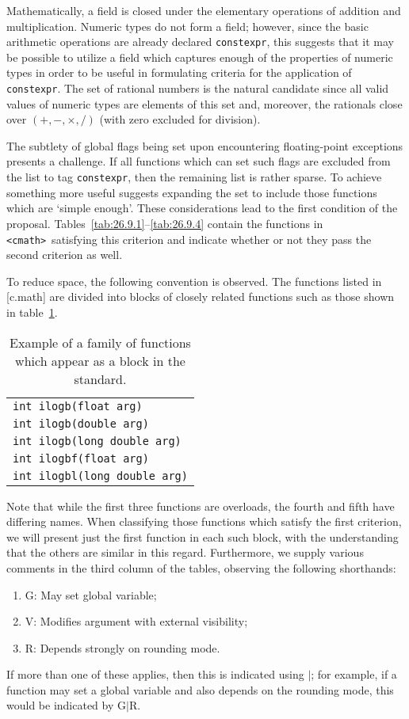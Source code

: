 \documentclass[prd,twocolumn,amsmath,amssymb,nofootinbib,eqsecnum]{revtex4-1}
\newcommand{\constexpr}{\code{constexpr}\xspace}
\newcommand{\code}[1]{{\tt #1}}
\newcommand{\header}[1]{{\tt <#1>}}
\newcommand{\cmath}{\header{cmath}}
\begin{document}
Mathematically, a field is closed under the elementary operations of addition
and multiplication.
Numeric types do not form a field; however, since the basic arithmetic
operations are already declared \constexpr, this suggests that it may be
possible to utilize a field which captures enough of the properties of numeric
types in order to be useful in formulating criteria for the application of
\constexpr. The set of rational numbers is the natural candidate since all valid
values of numeric types are elements of this set and, moreover, the rationals close over
$(+,-,\times,/)$ (with zero excluded for division).

The subtlety of global flags being set upon encountering floating-point
exceptions presents a challenge. If all functions which can set such flags are
excluded from the list to tag \constexpr, then the remaining list is rather
sparse. To achieve something more useful suggests expanding the set to include
those functions which are `simple enough'. These considerations lead to the
first condition of the proposal.
Tables~\ref{tab:26.9.1}--\ref{tab:26.9.4} contain the functions in \cmath\
satisfying this criterion and indicate whether or not they pass the second
criterion as well. 

To reduce space, the following convention is observed. The
functions listed in [c.math] are divided into blocks of closely related
functions such as those shown in table~\ref{tab:example}. 
\begin{table}[h]
	\begin{tabular}{l}
		\code{int ilogb(float arg)}
	\\
		\code{int ilogb(double arg)}
	\\
		\code{int ilogb(long double arg)}
	\\
		\code{int ilogbf(float arg)}
	\\
		\code{int ilogbl(long double arg)}
	\end{tabular}
\caption{Example of a family of functions which appear as a block in the standard.}
\label{tab:example}
\end{table}
Note that while the first three functions are overloads, the fourth and fifth
have differing names.  When classifying those functions which satisfy the first
criterion, we will present just the first function in each such block, with the
understanding that the others are similar in this regard. Furthermore, 
we supply various comments in the
third column of the tables, observing the following shorthands:
\begin{enumerate}
	\item G: May set global variable;
	
	\item V: Modifies argument with external visibility;
	
	\item R: Depends strongly on rounding mode.
\end{enumerate}
If more than one of these applies, then this is indicated using $\vert$; for example, if a function may set a global variable and also depends on the rounding mode, this would be indicated by G$\vert$R.
\end{document}
